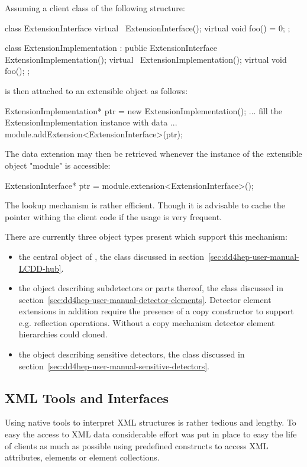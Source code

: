 \documentclass[10pt,a4paper]{article}
\begin{document}
Assuming a client class of the following structure:
\begin{code}
    class ExtensionInterface {
      virtual ~ExtensionInterface();
      virtual void foo() = 0;
    };

    class ExtensionImplementation : public ExtensionInterface {
      ExtensionImplementation();
      virtual ~ExtensionImplementation();
      virtual void foo();
    };
\end{code}
is then attached to an extensible object as follows:
\begin{code}
    ExtensionImplementation* ptr = new ExtensionImplementation();
    ... fill the ExtensionImplementation instance with data ...
    module.addExtension<ExtensionInterface>(ptr);
\end{code}
The data extension may then be retrieved whenever the instance of the
extensible object "module" is accessible:
\begin{code}
    ExtensionInterface* ptr = module.extension<ExtensionInterface>();
\end{code}
The lookup mechanism is rather efficient. Though it is advisable to
cache the pointer withing the client code if the usage is very frequent.


\noindent
There are currently three object types present which support this mechanism:
\begin{itemize}\itemcompact
\item the central object of \DDhep, the  class discussed in 
        section~\ref{sec:dd4hep-user-manual-LCDD-hub}.
\item the object describing subdetectors or parts thereof, the 
         class discussed in 
        section~\ref{sec:dd4hep-user-manual-detector-elements}.
        Detector element extensions in addition require the presence 
        of a copy constructor to support e.g. reflection operations.
        Without a copy mechanism detector element hierarchies could 
        cloned.
\item the object describing sensitive detectors, 
       the  class discussed in 
       section~\ref{sec:dd4hep-user-manual-sensitive-detectors}.
\end{itemize}


\newpage
\subsection{XML Tools and Interfaces}
\label{sec:dd4hep-user-manual-xml-tools}
\noindent
Using native tools to interpret XML structures is rather tedious and lengthy.
To easy the access to XML data considerable effort was put in place to easy
the life of clients as much as possible using predefined constructs to 
access XML attributes, elements or element collections.
\end{document}
